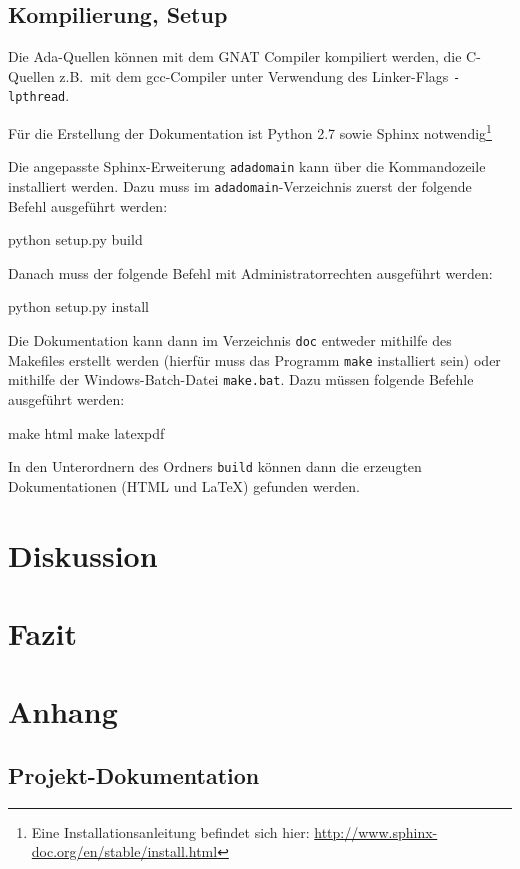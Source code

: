 \documentclass[oneside]{elaboration}
\begin{document}
\section{Kompilierung, Setup}
\label{sec:kompilierung_setup}

Die Ada-Quellen können mit dem GNAT Compiler kompiliert werden, die C-Quellen
z.B.\ mit dem gcc-Compiler unter Verwendung des Linker-Flags \texttt{-lpthread}.

Für die Erstellung der Dokumentation ist Python 2.7 sowie Sphinx
notwendig\footnote{Eine Installationsanleitung befindet sich hier:
\url{http://www.sphinx-doc.org/en/stable/install.html}}

Die angepasste Sphinx-Erweiterung \texttt{adadomain} kann über die Kommandozeile
installiert werden. Dazu muss im \texttt{adadomain}-Verzeichnis zuerst der
folgende Befehl ausgeführt werden:

\begin{bashcode}
    python setup.py build
\end{bashcode}

Danach muss der folgende Befehl mit Administratorrechten ausgeführt werden:

\begin{bashcode}
    python setup.py install
\end{bashcode}

Die Dokumentation kann dann im Verzeichnis \texttt{doc} entweder mithilfe des
Makefiles erstellt werden (hierfür muss das Programm \texttt{make} installiert
sein) oder mithilfe der Windows-Batch-Datei \texttt{make.bat}. Dazu
müssen folgende Befehle ausgeführt werden:

\begin{bashcode}
    make html
    make latexpdf
\end{bashcode}

In den Unterordnern des Ordners \texttt{build} können dann die erzeugten
Dokumentationen (HTML und LaTeX) gefunden werden.

\chapter{Diskussion}
\label{chp:diskussion}

\chapter{Fazit}
\label{chp:fazit}


\clearpage

\printbibliography

\appendix{}
\chapter{Anhang}
\label{chp:anhang}

\section{Projekt-Dokumentation}
\label{sec:projekt-dokumentation}
\end{document}
